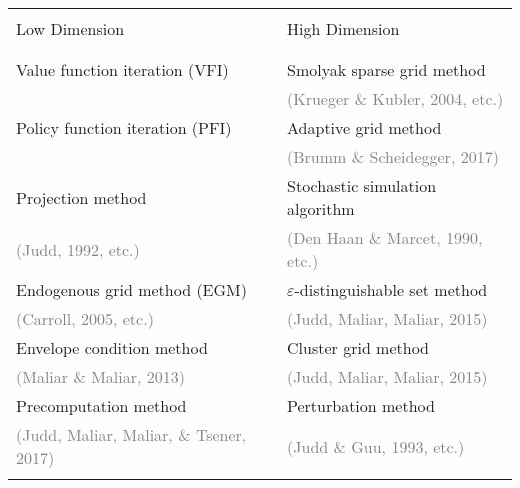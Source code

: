\documentclass[12pt]{article}
\begin{document}
\begin{table}[h!]
\begin{tabular}{p{7cm} | p{7cm}}
\hline
\\[-1.0em]
Low Dimension & High Dimension\\
\\[-1.0em]
\hline
\\[-0.7em]
Value function iteration (VFI) & Smolyak sparse grid method\\
& \hspace{0.1em} \textcolor{gray}{{\footnotesize (Krueger \& Kubler, 2004, etc.)}} \\
Policy function iteration (PFI) & Adaptive grid method \\
& \hspace{0.1em} \textcolor{gray}{{\footnotesize (Brumm \& Scheidegger, 2017)}} \\
Projection method & Stochastic simulation algorithm \\
 \hspace{0.1em} \textcolor{gray}{{\footnotesize (Judd, 1992, etc.)}} & \hspace{0.1em} \textcolor{gray}{{\footnotesize (Den Haan \& Marcet, 1990, etc.)}} \\
Endogenous grid method (EGM) & $\varepsilon$-distinguishable set method \\
\hspace{0.1em} \textcolor{gray}{{\footnotesize (Carroll, 2005, etc.)}} & \hspace{0.1em} \textcolor{gray}{{\footnotesize (Judd, Maliar, Maliar, 2015)}} \\
Envelope condition method & Cluster grid method \\
\hspace{0.1em} \textcolor{gray}{{\footnotesize (Maliar \& Maliar, 2013)}} & \hspace{0.1em} \textcolor{gray}{{\footnotesize (Judd, Maliar, Maliar, 2015)}} \\
Precomputation method & Perturbation method \\
\hspace{0.1em} \textcolor{gray}{{\footnotesize (Judd, Maliar, Maliar, \& Tsener, 2017)}} & \hspace{0.1em} \textcolor{gray}{{\footnotesize (Judd \& Guu, 1993, etc.)}}\\
[-0.7em]\\\hline
\end{tabular}
\end{table}
\end{document}
